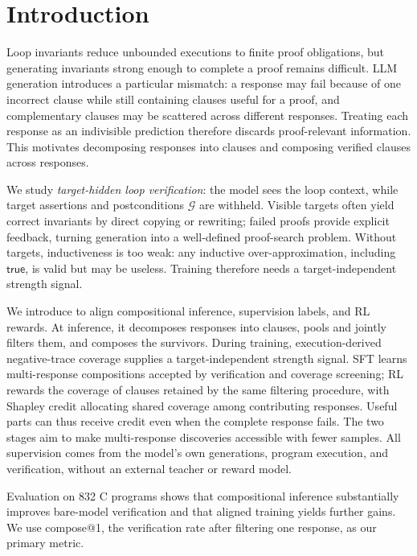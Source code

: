 \section{Introduction}\label{sec:intro}

Loop invariants reduce unbounded executions to finite proof obligations, but
generating invariants strong enough to complete a proof remains difficult.
LLM generation introduces a particular mismatch: a response may fail because
of one incorrect clause while still containing clauses useful for a proof, and
complementary clauses may be scattered across different responses.  Treating
each response as an indivisible prediction therefore discards proof-relevant
information.  This motivates decomposing responses into clauses and composing
verified clauses across responses.

We study \emph{target-hidden loop verification}: the model sees the loop
context, while target assertions and postconditions \(\mathcal G\) are withheld.
Visible targets often yield correct invariants by direct copying or rewriting;
failed proofs provide explicit feedback, turning generation into a
well-defined proof-search problem.  Without targets, inductiveness is too weak: any inductive
over-approximation, including \(\mathsf{true}\), is valid but may be useless.
Training therefore needs a target-independent strength signal.

We introduce \sam{} to align compositional inference, supervision labels,
and RL rewards.  At inference, it decomposes responses into clauses, pools
and jointly filters them, and composes the survivors.  During training,
execution-derived negative-trace coverage supplies a target-independent
strength signal.  SFT learns multi-response compositions accepted by
verification and coverage screening; RL rewards the coverage of clauses
retained by the same filtering procedure, with Shapley credit allocating
shared coverage among contributing responses.  Useful parts can thus receive
credit even when the complete response fails.  The two stages aim to make
multi-response discoveries accessible with fewer samples.  All supervision
comes from the model's own generations, program execution, and verification,
without an external teacher or reward model.

Evaluation on 832 C programs shows that compositional inference substantially
improves bare-model verification and that aligned training yields further
gains.  We use compose@1, the verification rate after filtering one response,
as our primary metric.

